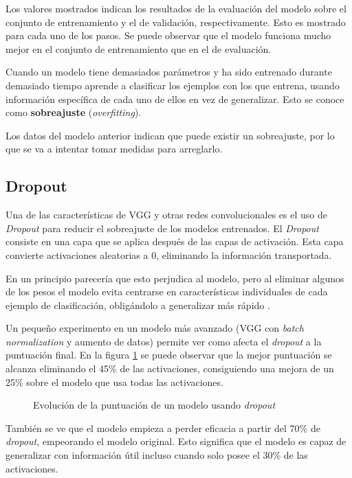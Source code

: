 Los valores mostrados indican los resultados de la evaluación del modelo sobre el conjunto de entrenamiento y el de validación, respectivamente. Esto es mostrado para cada uno de los pasos. Se puede observar que el modelo funciona mucho mejor en el conjunto de entrenamiento que en el de evaluación.

Cuando un modelo tiene demasiados parámetros y ha sido entrenado durante demasiado tiempo aprende a clasificar los ejemplos con los que entrena, usando información específica de cada uno de ellos en vez de generalizar. Esto se conoce como \textbf{sobreajuste} (\textit{overfitting}).

Los datos del modelo anterior indican que puede existir un sobreajuste, por lo que se va a intentar tomar medidas para arreglarlo.

\subsection{Dropout}

Una de las características de VGG y otras redes convolucionales es el uso de \textit{Dropout} para reducir el sobreajuste de los modelos entrenados. El \textit{Dropout} consiste en una capa que se aplica después de las capas de activación. Esta capa convierte activaciones aleatorias a 0, eliminando la información transportada.

En un principio parecería que esto perjudica al modelo, pero al eliminar algunos de los pesos el modelo evita centrarse en características individuales de cada ejemplo de clasificación, obligándolo a generalizar más rápido \parencite{krizhevsky2012imagenet}.

Un pequeño experimento en un modelo más avanzado (VGG con \textit{batch normalization} y aumento de datos) permite ver  como afecta el \textit{dropout} a la puntuación final. En la figura \ref{dropout} se puede observar que la mejor puntuación se alcanza eliminando el 45\% de las activaciones, consiguiendo una mejora de un 25\% sobre el modelo que usa todas las activaciones.

\begin{figure}
    \caption{Evolución de la puntuación de un modelo usando \textit{dropout}}
\label{dropout}
\end{figure}


También se ve que el modelo empieza a perder eficacia a partir del 70\% de \textit{dropout}, empeorando el modelo original. Esto significa que el modelo es capaz de generalizar con información útil incluso cuando solo posee el 30\% de las activaciones.

